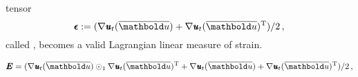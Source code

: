  tensor
\begin{equation}
 \tnr{\epsilon}:=(\fua{\nabla\tnr{\mathit{u}}_t}{\overline{\vto{u}}}+\fua{\nabla\tnr{\mathit{u}}_t}{\overline{\vto{u}}}^{\text{T}})/2\,,
\end{equation}
called , becomes a valid Lagrangian linear measure of strain.







\begin{equation}
 \tnr{E}=(\fua{\nabla\tnr{\mathit{u}}_t}{\overline{\vto{u}}}\odot_1\fua{\nabla\tnr{\mathit{u}}_t}{\overline{\vto{u}}}^{\text{T}}+\fua{\nabla\tnr{\mathit{u}}_t}{\overline{\vto{u}}}+\fua{\nabla\tnr{\mathit{u}}_t}{\overline{\vto{u}}}^{\text{T}})/2\,,
\end{equation}